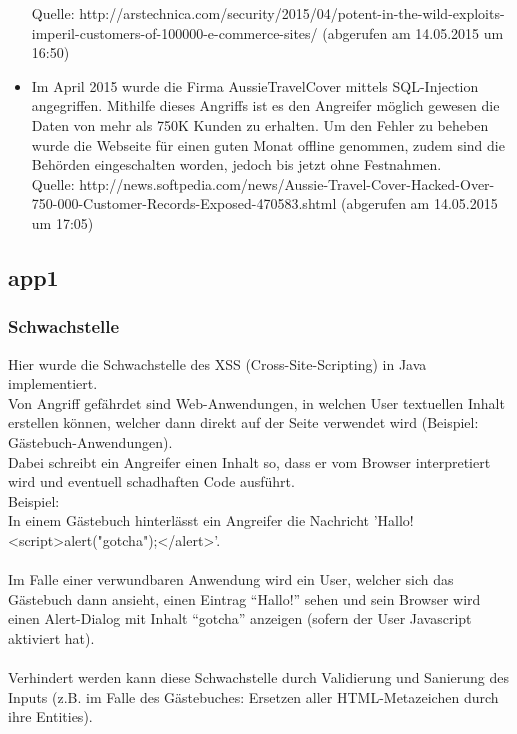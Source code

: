 \documentclass[12pt,a4paper,titlepage,oneside]{scrartcl}
\begin{document}
\begin{itemize}
Quelle: http://arstechnica.com/security/2015/04/potent-in-the-wild-exploits-imperil-customers-of-100000-e-commerce-sites/ (abgerufen am 14.05.2015 um 16:50)
\item Im April 2015 wurde die Firma AussieTravelCover mittels SQL-Injection angegriffen. Mithilfe dieses Angriffs ist es den Angreifer möglich gewesen die Daten von mehr als 750K Kunden zu erhalten. Um den Fehler zu beheben wurde die Webseite für einen guten Monat offline genommen, zudem sind die Behörden eingeschalten worden, jedoch bis jetzt ohne Festnahmen. \\
Quelle: http://news.softpedia.com/news/Aussie-Travel-Cover-Hacked-Over-750-000-Customer-Records-Exposed-470583.shtml (abgerufen am 14.05.2015 um 17:05)
\end{itemize}


\subsection{app1}

\subsubsection{Schwachstelle}
Hier wurde die Schwachstelle des XSS (Cross-Site-Scripting) in Java implementiert.\\
Von Angriff gefährdet sind Web-Anwendungen, in welchen User textuellen Inhalt erstellen können, welcher dann direkt auf der Seite verwendet wird (Beispiel: Gästebuch-Anwendungen).\\
Dabei schreibt ein Angreifer einen Inhalt so, dass er vom Browser interpretiert wird und eventuell schadhaften Code ausführt.\\
Beispiel:\\
In einem Gästebuch hinterlässt ein Angreifer die Nachricht 'Hallo!<script>alert("gotcha");</alert>'.
\\\\
Im Falle einer verwundbaren Anwendung wird ein User, welcher sich das Gästebuch dann ansieht, einen Eintrag ``Hallo!'' sehen und sein Browser wird einen Alert-Dialog mit Inhalt ``gotcha''  anzeigen (sofern der User Javascript aktiviert hat).
\\\\
Verhindert werden kann diese Schwachstelle durch Validierung und Sanierung des Inputs (z.B. im Falle des Gästebuches: Ersetzen aller HTML-Metazeichen durch ihre Entities).
\end{document}
